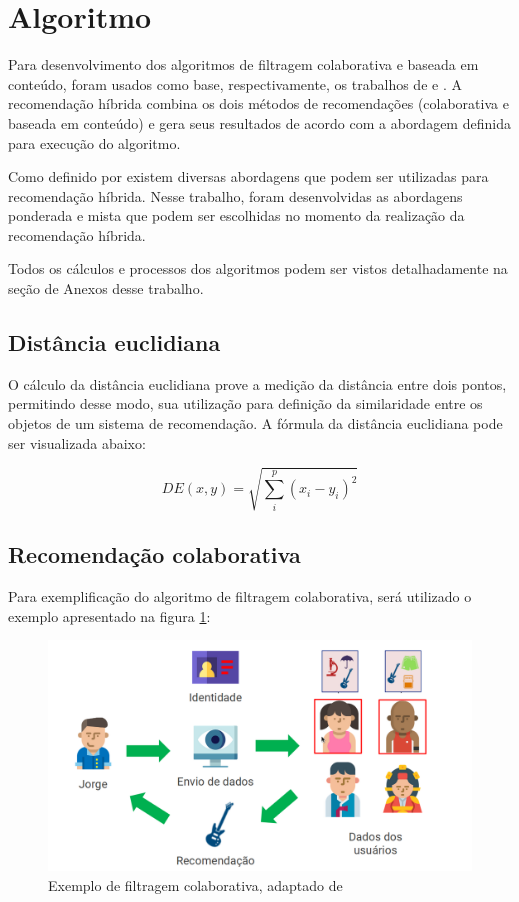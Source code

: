 \section{Algoritmo}

Para desenvolvimento dos algoritmos de filtragem colaborativa e baseada em conteúdo, foram usados como base, respectivamente, os trabalhos de  e . A recomendação híbrida combina os dois métodos de recomendações (colaborativa e baseada em conteúdo) e gera seus resultados de acordo com a abordagem definida para execução do algoritmo.

Como definido por \cite{barbosa2014} existem diversas abordagens que podem ser utilizadas para recomendação híbrida. Nesse trabalho, foram desenvolvidas as abordagens ponderada e mista que podem ser escolhidas no momento da realização da recomendação híbrida.

Todos os cálculos e processos dos algoritmos podem ser vistos detalhadamente na seção de Anexos desse trabalho.

\subsection{Distância euclidiana}

O cálculo da distância euclidiana prove a medição da distância entre dois pontos, permitindo desse modo, sua utilização para definição da similaridade entre os objetos de um sistema de recomendação. A fórmula da distância euclidiana pode ser visualizada abaixo:

\begin{equation*}
    DE\left( x,y\right)   = \sqrt {\sum _{i}^{p}  \left( x_{i}-y_{i}\right)^2 }
    \label{eq:euclidiana}
\end{equation*}

\subsection{Recomendação colaborativa}

Para exemplificação do algoritmo de filtragem colaborativa, será utilizado o exemplo apresentado na figura \ref{fig:algoritmocolaborativo}:

\begin{figure}[H]
	\centering
	\includegraphics[width=0.7\linewidth]{imagens/colaborativa.png}
	\caption[Exemplo de filtragem colaborativa]{Exemplo de filtragem colaborativa, adaptado de \cite{araujo2011apprecommender}}
    \label{fig:algoritmocolaborativo}
\end{figure}

